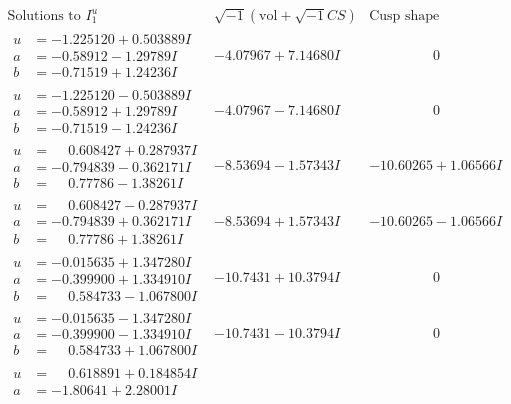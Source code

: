 \documentclass[1p]{elsarticle_modified}
\theoremstyle{definition}
\newcommand{\I}{\sqrt{-1}}
\begin{document}
$$\begin{array}{c|c|c}
\text{Solutions to }I^u_{1}& \I (\text{vol} + \sqrt{-1}CS) & \text{Cusp shape}\\
 \hline 
\begin{aligned}
u &= -1.225120 + 0.503889 I \\
a &= -0.58912 - 1.29789 I \\
b &= -0.71519 + 1.24236 I\end{aligned}
 & -4.07967 + 7.14680 I & \phantom{-0.000000 } 0 \\ \hline\begin{aligned}
u &= -1.225120 - 0.503889 I \\
a &= -0.58912 + 1.29789 I \\
b &= -0.71519 - 1.24236 I\end{aligned}
 & -4.07967 - 7.14680 I & \phantom{-0.000000 } 0 \\ \hline\begin{aligned}
u &= \phantom{-}0.608427 + 0.287937 I \\
a &= -0.794839 - 0.362171 I \\
b &= \phantom{-}0.77786 - 1.38261 I\end{aligned}
 & -8.53694 - 1.57343 I & -10.60265 + 1.06566 I \\ \hline\begin{aligned}
u &= \phantom{-}0.608427 - 0.287937 I \\
a &= -0.794839 + 0.362171 I \\
b &= \phantom{-}0.77786 + 1.38261 I\end{aligned}
 & -8.53694 + 1.57343 I & -10.60265 - 1.06566 I \\ \hline\begin{aligned}
u &= -0.015635 + 1.347280 I \\
a &= -0.399900 + 1.334910 I \\
b &= \phantom{-}0.584733 - 1.067800 I\end{aligned}
 & -10.7431 + 10.3794 I & \phantom{-0.000000 } 0 \\ \hline\begin{aligned}
u &= -0.015635 - 1.347280 I \\
a &= -0.399900 - 1.334910 I \\
b &= \phantom{-}0.584733 + 1.067800 I\end{aligned}
 & -10.7431 - 10.3794 I & \phantom{-0.000000 } 0 \\ \hline\begin{aligned}
u &= \phantom{-}0.618891 + 0.184854 I \\
a &= -1.80641 + 2.28001 I \\

\end{aligned}
\end{array}$$
\end{document}
